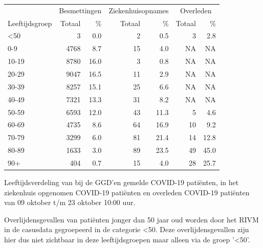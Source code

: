 \documentclass[
  english,
  man,floatsintext]{apa6}
\begin{document}
\begin{table}
\centering\begingroup\fontsize{11}{13}\selectfont

\begin{threeparttable}
\begin{tabular}{lrrrrrr}
\toprule
\multicolumn{1}{c}{ } & \multicolumn{2}{c}{Besmettingen} & \multicolumn{2}{c}{Ziekenhuisopnames} & \multicolumn{2}{c}{Overleden} \\
\cmidrule(l{3pt}r{3pt}){2-3} \cmidrule(l{3pt}r{3pt}){4-5} \cmidrule(l{3pt}r{3pt}){6-7}
Leeftijdsgroep & Totaal & \% & Totaal & \% & Totaal & \%\\
\midrule
<50 & 3 & 0.0 & 2 & 0.5 & 3 & 2.8\\
0-9 & 4768 & 8.7 & 15 & 4.0 & NA & NA\\
10-19 & 8780 & 16.0 & 3 & 0.8 & NA & NA\\
20-29 & 9047 & 16.5 & 11 & 2.9 & NA & NA\\
30-39 & 8257 & 15.1 & 25 & 6.6 & NA & NA\\
40-49 & 7321 & 13.3 & 31 & 8.2 & NA & NA\\
50-59 & 6593 & 12.0 & 43 & 11.3 & 5 & 4.6\\
60-69 & 4735 & 8.6 & 64 & 16.9 & 10 & 9.2\\
70-79 & 3299 & 6.0 & 81 & 21.4 & 14 & 12.8\\
80-89 & 1633 & 3.0 & 89 & 23.5 & 49 & 45.0\\
90+ & 404 & 0.7 & 15 & 4.0 & 28 & 25.7\\
\bottomrule
\end{tabular}
\begin{tablenotes}
\item[1] Leeftijdsverdeling van bij de GGD’en gemelde COVID-19 patiënten, in het ziekenhuis opgenomen COVID-19 patiënten en overleden COVID-19 patiënten van 09 oktober t/m 23 oktober 10:00 uur.
\item[2] Overlijdensgevallen van patiënten jonger dan 50 jaar oud worden door het RIVM in de casusdata gegroepeerd in de categorie <50. Deze overlijdensgevallen zijn hier dus niet zichtbaar in deze leeftijdsgroepen maar alleen via de groep '<50'.
\end{tablenotes}
\end{threeparttable}
\endgroup{}
\end{table}

\newpage
\end{document}
